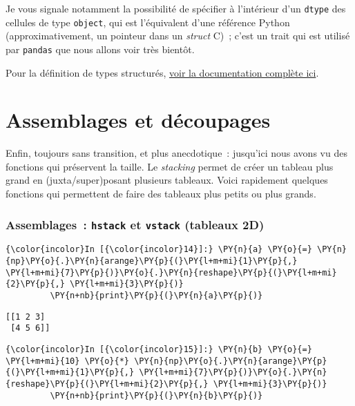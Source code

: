Je vous signale notamment la possibilité de spécifier à l'intérieur d'un
\texttt{dtype} des cellules de type \texttt{object}, qui est
l'équivalent d'une référence Python (approximativement, un pointeur dans
un \emph{struct} C)~; c'est un trait qui est utilisé par \texttt{pandas}
que nous allons voir très bientôt.

Pour la définition de types structurés,
\href{https://docs.scipy.org/doc/numpy-1.13.0/user/basics.rec.html\#defining-structured-arrays}{voir
la documentation complète ici}.

    \hypertarget{assemblages-et-duxe9coupages}{%
\section{Assemblages et découpages}\label{assemblages-et-duxe9coupages}}

    Enfin, toujours sans transition, et plus anecdotique~: jusqu'ici nous
avons vu des fonctions qui préservent la taille. Le \emph{stacking}
permet de créer un tableau plus grand en (juxta/super)posant plusieurs
tableaux. Voici rapidement quelques fonctions qui permettent de faire
des tableaux plus petits ou plus grands.

    \hypertarget{assemblages-hstack-et-vstack-tableaux-2d}{%
\subsubsection{\texorpdfstring{Assemblages~: \texttt{hstack} et
\texttt{vstack} (tableaux
2D)}{Assemblages~: hstack et vstack (tableaux 2D)}}\label{assemblages-hstack-et-vstack-tableaux-2d}}

    \begin{Verbatim}[commandchars=\\\{\},frame=single,framerule=0.3mm,rulecolor=\color{cellframecolor}]
{\color{incolor}In [{\color{incolor}14}]:} \PY{n}{a} \PY{o}{=} \PY{n}{np}\PY{o}{.}\PY{n}{arange}\PY{p}{(}\PY{l+m+mi}{1}\PY{p}{,} \PY{l+m+mi}{7}\PY{p}{)}\PY{o}{.}\PY{n}{reshape}\PY{p}{(}\PY{l+m+mi}{2}\PY{p}{,} \PY{l+m+mi}{3}\PY{p}{)}
         \PY{n+nb}{print}\PY{p}{(}\PY{n}{a}\PY{p}{)}
\end{Verbatim}


    \begin{Verbatim}[commandchars=\\\{\},frame=single,framerule=0.3mm,rulecolor=\color{cellframecolor}]
[[1 2 3]
 [4 5 6]]
\end{Verbatim}

    \begin{Verbatim}[commandchars=\\\{\},frame=single,framerule=0.3mm,rulecolor=\color{cellframecolor}]
{\color{incolor}In [{\color{incolor}15}]:} \PY{n}{b} \PY{o}{=} \PY{l+m+mi}{10} \PY{o}{*} \PY{n}{np}\PY{o}{.}\PY{n}{arange}\PY{p}{(}\PY{l+m+mi}{1}\PY{p}{,} \PY{l+m+mi}{7}\PY{p}{)}\PY{o}{.}\PY{n}{reshape}\PY{p}{(}\PY{l+m+mi}{2}\PY{p}{,} \PY{l+m+mi}{3}\PY{p}{)}
         \PY{n+nb}{print}\PY{p}{(}\PY{n}{b}\PY{p}{)}
\end{Verbatim}


